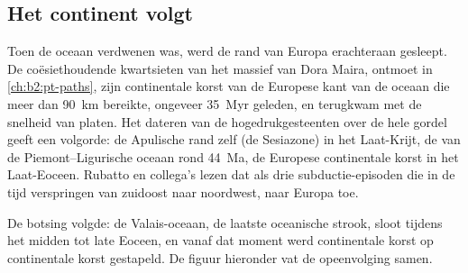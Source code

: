 \subsection*{Het continent volgt}

Toen de oceaan verdwenen was, werd de rand van Europa erachteraan gesleept. De coësiethoudende
kwartsieten van het massief van Dora Maira, ontmoet in \cref{ch:b2:pt-paths}, zijn continentale korst
van de Europese kant van de oceaan die meer dan \qty{90}{km} bereikte, ongeveer
\qty{35}{Myr} geleden, en terugkwam met de snelheid van platen. Het dateren van de hogedrukgesteenten
over de hele gordel geeft een volgorde: de Apulische rand zelf (de Sesiazone) in het
Laat-Krijt, de  van de Piemont--Ligurische oceaan rond \qty{44}{Ma}, de
Europese continentale korst in het Laat-Eoceen. Rubatto en collega's lezen dat als drie subductie-episoden die in de tijd verspringen van
zuidoost naar noordwest, naar Europa toe.

De botsing volgde: de Valais-oceaan, de laatste oceanische strook, sloot tijdens het midden tot
late Eoceen, en vanaf dat moment werd continentale korst op continentale korst gestapeld.
De figuur hieronder vat de opeenvolging samen.

